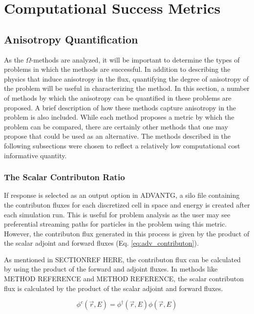 \section{Computational Success Metrics}
\label{sec:successmetrics}
\subsection{Anisotropy Quantification}

As the $\Omega$-methods are analyzed, it will be important to determine the
types of problems in which the methods are successful. In addition to describing
the physics that induce anisotropy in the flux, quantifying the degree of
anisotropy of the problem will be useful in characterizing the method. In this
section, a number
of methods by which the anisotropy can be quantified in these problems are
proposed. A brief description of how these methods capture anisotropy in the
problem is also included. While each method proposes a metric by which the
problem can be compared, there are certainly other methods that one may propose
that could be used as an alternative. The methods described in the following
subsections were chosen to reflect a relatively low computational cost
informative quantity.

\subsubsection{The Scalar Contributon Ratio}

If response is selected as an output option in ADVANTG, a silo file containing
the contributon fluxes for each discretized cell in space and energy  is
created after
each simulation run. This is useful for problem analysis as the user may see
preferential streaming paths for particles in the problem using this metric.
However, the contributon flux generated in this process is given by the product
of the scalar adjoint and forward fluxes (Eq. \eqref{eq:adv_contributon}).

As mentioned in SECTIONREF HERE, the contributon flux can be calculated by using
the product of the forward and adjoint fluxes. In methods like METHOD REFERENCE
and METHOD REFERENCE, the scalar contributon flux is calculated by the product
of the scalar adjoint and forward fluxes.

\begin{equation}
  \phi^{c}(\vec {r} ,E)  = \phi^{\dagger}(\vec {r} ,E)\phi(\vec {r} ,E)
\label{eq:adv_contributon}
\end{equation}

